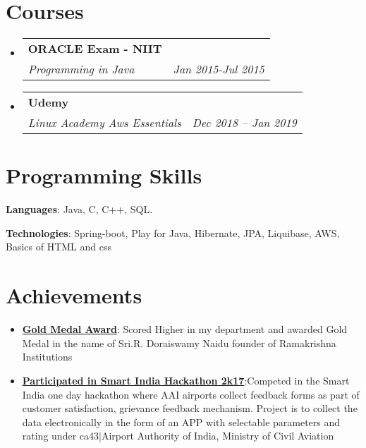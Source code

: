 \documentclass[letterpaper,12pt]{article}
\makeatletter
\newcommand{\resumeItem}[2]{
  \item\small{
    \textbf{#1}{:#2 \vspace{-2pt}}
  }
}
\newcommand{\resumeSubheading}[4]{
  \vspace{-1pt}\item
    \begin{tabular*}{0.97\textwidth}{l@{\extracolsep{\fill}}r}
      \textbf{#1} & #2 \\
      \textit{\small#3} & \textit{\small #4} \\
    \end{tabular*}\vspace{-5pt}
}
\newcommand{\resumeSubItem}[2]{\resumeItem{#1}{#2}\vspace{-4pt}}
\newcommand{\resumeSubHeadingListStart}{\begin{itemize}[leftmargin=*]}
\newcommand{\resumeSubHeadingListEnd}{\end{itemize}}
\makeatother
\begin{document}
\section{Courses}
  \resumeSubHeadingListStart
  \resumeSubheading
      {ORACLE Exam - NIIT}{}
      {Programming in Java}{Jan 2015-Jul 2015}
  \resumeSubHeadingListEnd

  \resumeSubHeadingListStart
    \resumeSubheading
      {Udemy}{}
      {Linux Academy Aws Essentials}{Dec 2018 -- Jan 2019}
  \resumeSubHeadingListEnd
  

\section{Programming Skills}
  \resumeSubHeadingListStart
    \item{
      \textbf{Languages}{: Java, C, C++, SQL.}
    \item
      \textbf{Technologies}{: Spring-boot, Play for Java, Hibernate, JPA, Liquibase, AWS, Basics of HTML and css}
    }
  \resumeSubHeadingListEnd



\section{Achievements}
  \resumeSubHeadingListStart
    \resumeSubItem {\href{https://drive.google.com/file/d/0ByYNj-1udG4iTFU4czFnWGo1b2M/view}{Gold Medal Award}}
      { Scored Higher in my department and awarded Gold Medal in the name of Sri.R. Doraiswamy Naidu founder of Ramakrishna Institutions }
    \resumeSubItem{\href{https://drive.google.com/file/d/0B1MYSgkEaqi2TU04RUtzTWp4bHVQMndlY1M4alZ1T1F3TzJF/view?usp=sharing}{Participated in Smart India Hackathon 2k17}}{Competed in the Smart India one day hackathon where AAI airports collect feedback forms as part of customer satisfaction, grievance feedback mechanism. Project is to collect the data electronically in the form of an APP with selectable parameters and rating under ca43|Airport Authority of India, Ministry of Civil Aviation}
    \resumeSubHeadingListEnd
\end{document}
